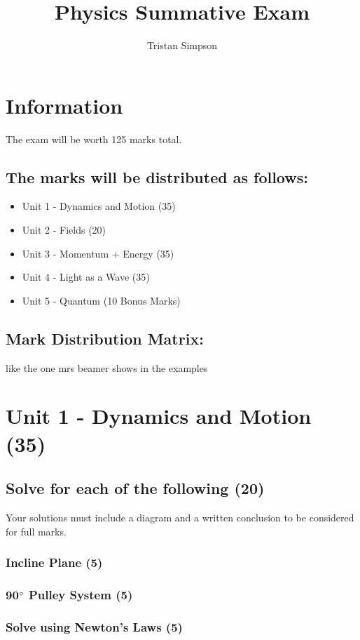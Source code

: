 \documentclass{article}
\title{Physics Summative Exam}
\author{Tristan Simpson}
\begin{document}
\maketitle
\tableofcontents
\doublespacing

\section{Information}
The exam will be worth 125 marks total.
\subsection*{The marks will be distributed as follows:}
\begin{itemize}
    \item Unit 1 - Dynamics and Motion (35)
    \item Unit 2 - Fields (20)
    \item Unit 3 - Momentum + Energy (35)
    \item Unit 4 - Light as a Wave (35)
    \item Unit 5 - Quantum (10 Bonus Marks)
\end{itemize}
\subsection*{Mark Distribution Matrix:}
like the one mrs beamer shows in the examples

\section{Unit 1 - Dynamics and Motion (35)}
\subsection{Solve for each of the following (20)}
Your solutions must include a diagram and a written conclusion to be considered for full marks.

\subsubsection{Incline Plane (5)}
\subsubsection{90$\degree$ Pulley System (5)}
\subsubsection{Solve using Newton's Laws (5)}
\end{document}

